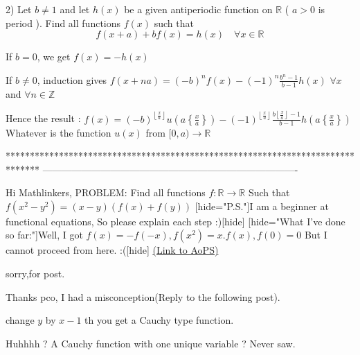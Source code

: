 \begin{solution}
	\begin{tcolorbox}2) Let $b\neq 1$ and let $h(x)$ be a  given antiperiodic function on $\mathbb R$ ( $a>0$ is period ). Find all functions $f(x)$ such that  \[f(x+a)+bf(x)=h(x) \quad \forall x\in\mathbb R \]\end{tcolorbox}
If $b=0$, we get $f(x)=-h(x)$

If $b\ne 0$, induction gives $f(x+na)=(-b)^nf(x)-(-1)^n\frac{b^n-1}{b-1}h(x)$ $\forall x$ and $\forall n\in\mathbb Z$

Hence the result : 
$\boxed{f(x)=(-b)^{\left\lfloor\frac xa\right\rfloor}u\left(a\left\{\frac xa\right\}\right)-(-1)^{\left\lfloor\frac xa\right\rfloor}\frac{b{\left\lfloor\frac xa\right\rfloor}-1}{b-1}h\left(a\left\{\frac xa\right\}\right)}$
Whatever is the function $u(x)$ from $[0,a)\to\mathbb R$
\end{solution}
*******************************************************************************
-------------------------------------------------------------------------------

\begin{problem}
	Hi Mathlinkers,
PROBLEM:
Find all functions $f:\mathbb{R}\rightarrow \mathbb{R}$ 
Such that $f(x^2-y^2)=(x-y)(f(x)+f(y))$
[hide="P.S."]I am a beginner at functional equations, So please explain each step :)[\/hide]
[hide="What I've done so far:"]Well, I got 
$f(x)=-f(-x),f(x^2)=x.f(x),f(0)=0$ But I cannot proceed from here. :([\/hide]
	\flushright \href{https://artofproblemsolving.com/community/c6h571907}{(Link to AoPS)}
\end{problem}



\begin{solution}
	sorry,for post.
\end{solution}



\begin{solution}
	Thanks pco,
I had a misconception(Reply to the following post).
\end{solution}



\begin{solution}
	\begin{tcolorbox}change $y$ by $x-1$ th you get a Cauchy type function.\end{tcolorbox}
Huhhhh ? A Cauchy function with one unique variable ? Never saw.
\end{solution}



